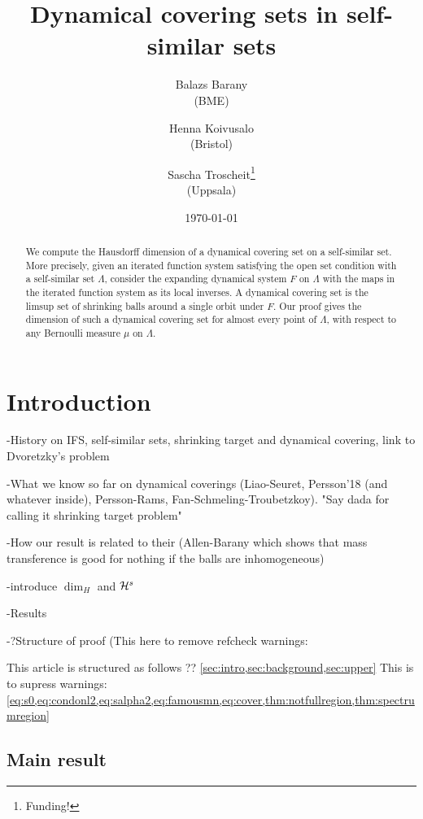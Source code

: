 \documentclass[12pt,]{article}
\title{Dynamical covering sets in self-similar sets}
\author{Balazs Barany \\(BME) \and Henna Koivusalo \\ (Bristol) \and Sascha Troscheit\footnote{Funding!} \\(Uppsala)}
\date{\today}
\theoremstyle{definition}
\theoremstyle{remark}
\newcommand{\cH}{{\cal H}}
\newcommand{\0}{\mathbf{0}}
\begin{document}
\frenchspacing
\maketitle

\begin{abstract}
  We compute the Hausdorff dimension of a dynamical covering set on a self-similar set. More
  precisely, given an iterated function system satisfying the open set condition with a self-similar
  set $\Lambda$, consider the expanding dynamical system $F$ on $\Lambda$ with the maps in the
  iterated function system as its local inverses. A dynamical covering set is the limsup set of
  shrinking balls around a single orbit under $F$. Our proof gives the dimension of such a dynamical
  covering set for almost every point of $\Lambda$, with respect to any  Bernoulli measure $\mu$ on
  $\Lambda$.
\end{abstract}



%
%


\section{Introduction} \label{sec:intro}

-History on IFS, self-similar sets, shrinking target and dynamical covering, link to Dvoretzky's problem

-What we know so far on dynamical coverings (Liao-Seuret, Persson'18 (and whatever inside), Persson-Rams, Fan-Schmeling-Troubetzkoy). "Say dada for calling it shrinking target problem"

-How our result is related to their (Allen-Barany which shows that mass transference is good for nothing if the balls are inhomogeneous)

-introduce $\dim_H$ and $\cH^s$

-Results

-?Structure of proof (This here to remove refcheck warnings:

This article is structured as follows ?? \cref{sec:intro,sec:background,sec:upper}
This is to supress warnings:
\cref{eq:s0,eq:condonl2,eq:salpha2,eq:famousmn,eq:cover,thm:notfullregion,thm:spectrumregion}
\clearpage

\subsection{Main result} \label{sec:background}
\end{document}
